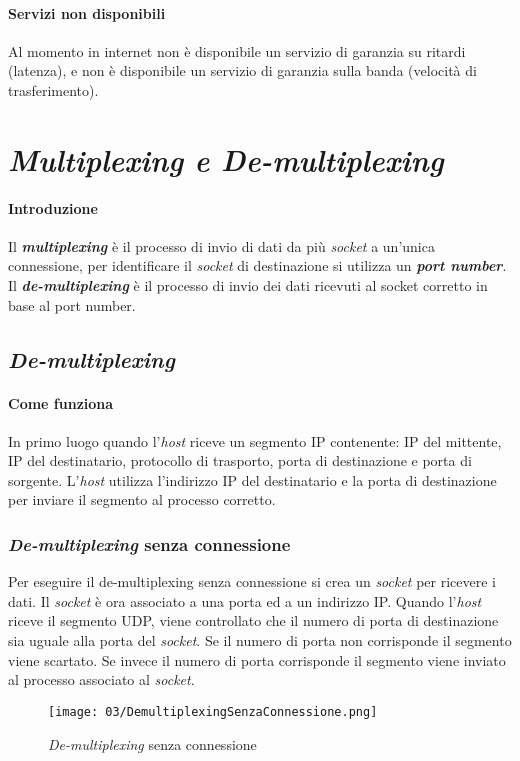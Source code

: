     \paragraph{Servizi non disponibili} Al momento in internet non è disponibile un servizio di garanzia su ritardi (latenza), e non è disponibile un servizio di garanzia sulla banda (velocità di trasferimento).
\section{\textit{Multiplexing e De-multiplexing}}
    \paragraph{Introduzione} Il \textit{\textbf{multiplexing}} è il processo di invio di dati da più \textit{socket} a un'unica connessione, per identificare il \textit{socket} di destinazione si utilizza un \textit{\textbf{port number}}. Il \textit{\textbf{de-multiplexing}} è il processo di invio dei dati ricevuti al socket corretto in base al port number.
    \subsection{\textit{De-multiplexing}}
        \paragraph{Come funziona} In primo luogo quando l'\textit{host} riceve un segmento \Acrshort*{IP} contenente: \Acrshort*{IP} del mittente, \Acrshort*{IP} del destinatario, protocollo di trasporto, porta di destinazione e porta di sorgente. L'\textit{host} utilizza l'indirizzo \Acrshort*{IP} del destinatario e la porta di destinazione per inviare il segmento al processo corretto.
        \subsubsection{\textit{De-multiplexing} senza connessione}
            Per eseguire il de-multiplexing senza connessione si crea un \textit{socket} per ricevere i dati. Il \textit{socket} è ora associato a una porta ed a un indirizzo \Acrshort*{IP}. Quando l'\textit{host} riceve il segmento \Acrshort*{UDP}, viene controllato che il numero di porta di destinazione sia uguale alla porta del \textit{socket}. Se il numero di porta non corrisponde il segmento viene scartato. Se invece il numero di porta corrisponde il segmento viene inviato al processo associato al \textit{socket}.
            \begin{figure}[H]
                \centering
                \texttt{[image: 03/DemultiplexingSenzaConnessione.png]}
                \caption{\textit{De-multiplexing} senza connessione}
            \end{figure}
